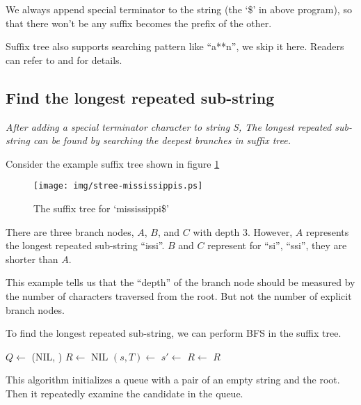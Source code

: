 \documentclass{article}
\begin{document}
We always append special terminator to the string (the `\$' in above program),
so that there won't be any suffix becomes the prefix of the other\cite{wiki-suffix-tree}.

Suffix tree also supports searching pattern like ``a**n'', we skip it here.
Readers can refer to \cite{ukkonen-lec} and \cite{ukkonen-search} for details.

\subsection{Find the longest repeated sub-string}

{\em After adding a special terminator character to string S, The
longest repeated sub-string can be found by searching the
deepest branches in suffix tree.}

Consider the example suffix tree shown in figure \ref{fig:stree-mississippis}

\begin{figure}[htbp]
  \centering
  \texttt{[image: img/stree-mississippis.ps]}
  \caption{The suffix tree for `mississippi\$'} \label{fig:stree-mississippis}
\end{figure}

There are three branch nodes, $A$, $B$, and $C$ with depth 3. However, $A$ represents
the longest repeated sub-string ``issi''. $B$ and $C$ represent for ``si'', ``ssi'',
they are shorter than $A$.

This example tells us that the ``depth'' of the branch node should be measured
by the number of characters traversed from the root. But not the number of
explicit branch nodes.

To find the longest repeated sub-string, we can perform BFS in the suffix tree.

\begin{algorithmic}[1]
  \State $Q \gets$ (NIL, )
  \State $R \gets$ NIL
    \State $(s, T) \gets$ 
        \State $s' \gets$ 
        \State {}
        \State $R \gets$ 
      \EndIf
    \EndFor
  \EndWhile
  \State \Return $R$
\EndFunction
\end{algorithmic}

This algorithm initializes a queue with a pair of an
empty string and the root. Then it repeatedly examine the candidate in the queue.
\end{document}
